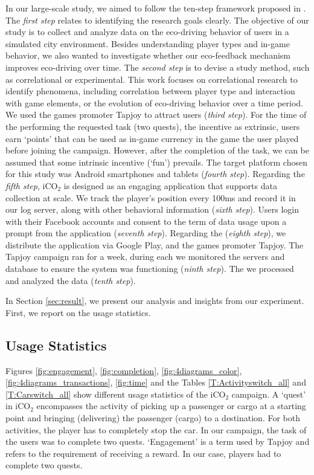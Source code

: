 \documentclass[preprint,authoryear,12pt]{elsarticle}
\begin{document}
In our large-scale study, we aimed to follow the ten-step framework proposed in \citep{Henze2013}.
The {\itshape first step\/} relates to identifying the research goals clearly. The objective of our study is to collect and analyze data on the eco-driving behavior of users in a simulated city environment. Besides understanding player types and in-game behavior, we also wanted to investigate whether our eco-feedback mechanism improves eco-driving over time. The {\itshape second step\/} is to devise a study method, such as correlational or experimental. This work focuses on correlational research to identify phenomena, including correlation between player type and interaction with game elements, or the evolution of eco-driving behavior over a time period. We used the games promoter Tapjoy to attract users ({\itshape third step}). For the time of the performing the requested task (two quests), the incentive as extrinsic, users earn `points' that can be used as in-game currency in the game the user played before joining the campaign. However, after the completion of the task, we can be assumed that some intrinsic incentive (`fun') prevails.
The target platform chosen for this study was Android smartphones and tablets ({\itshape fourth step}). Regarding the {\itshape fifth step}, iCO$_2$ is designed as an engaging application that supports data collection at scale. We track the player's position every 100ms and record it in our log server, along with other behavioral information ({\itshape sixth step}). Users login with their Facebook accounts and consent to the term of data usage upon a prompt from the application ({\itshape seventh step}). Regarding the ({\itshape eighth step}), we distribute the application via Google Play, and the games promoter Tapjoy.
The Tapjoy campaign ran for a week, during each we monitored the servers and database to ensure the system was functioning ({\itshape ninth step}). The we processed and analyzed the data ({\itshape tenth step}).

In Section \ref{sec:result}, we present our analysis and insights from our experiment. First, we report on the usage statistics.


\subsection{Usage Statistics}
\label{subsec:usage_stats}

Figures \ref{fig:engagement}, \ref{fig:completion}, \ref{fig:4diagrams_color}, \ref{fig:4diagrams_transactions},  \ref{fig:time} and the Tables \ref{T:Activityswitch_all} and \ref{T:Carswitch_all}  show different usage statistics of the iCO$_2$ campaign. A `quest' in iCO$_2$ encompasses the activity of picking up a passenger or cargo at a starting point and bringing (delivering) the passenger (cargo) to a destination. For both activities, the player has to completely stop the car. In our campaign, the task of the users was to complete two quests.
`Engagement' is a term used by Tapjoy and refers to the requirement of receiving a reward. In our case, players had to complete two quests.
\end{document}
